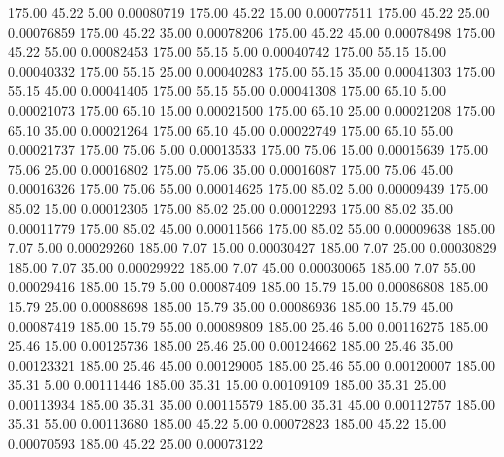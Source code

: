     175.00     45.22      5.00     0.00080719
    175.00     45.22     15.00     0.00077511
    175.00     45.22     25.00     0.00076859
    175.00     45.22     35.00     0.00078206
    175.00     45.22     45.00     0.00078498
    175.00     45.22     55.00     0.00082453
    175.00     55.15      5.00     0.00040742
    175.00     55.15     15.00     0.00040332
    175.00     55.15     25.00     0.00040283
    175.00     55.15     35.00     0.00041303
    175.00     55.15     45.00     0.00041405
    175.00     55.15     55.00     0.00041308
    175.00     65.10      5.00     0.00021073
    175.00     65.10     15.00     0.00021500
    175.00     65.10     25.00     0.00021208
    175.00     65.10     35.00     0.00021264
    175.00     65.10     45.00     0.00022749
    175.00     65.10     55.00     0.00021737
    175.00     75.06      5.00     0.00013533
    175.00     75.06     15.00     0.00015639
    175.00     75.06     25.00     0.00016802
    175.00     75.06     35.00     0.00016087
    175.00     75.06     45.00     0.00016326
    175.00     75.06     55.00     0.00014625
    175.00     85.02      5.00     0.00009439
    175.00     85.02     15.00     0.00012305
    175.00     85.02     25.00     0.00012293
    175.00     85.02     35.00     0.00011779
    175.00     85.02     45.00     0.00011566
    175.00     85.02     55.00     0.00009638
    185.00      7.07      5.00     0.00029260
    185.00      7.07     15.00     0.00030427
    185.00      7.07     25.00     0.00030829
    185.00      7.07     35.00     0.00029922
    185.00      7.07     45.00     0.00030065
    185.00      7.07     55.00     0.00029416
    185.00     15.79      5.00     0.00087409
    185.00     15.79     15.00     0.00086808
    185.00     15.79     25.00     0.00088698
    185.00     15.79     35.00     0.00086936
    185.00     15.79     45.00     0.00087419
    185.00     15.79     55.00     0.00089809
    185.00     25.46      5.00     0.00116275
    185.00     25.46     15.00     0.00125736
    185.00     25.46     25.00     0.00124662
    185.00     25.46     35.00     0.00123321
    185.00     25.46     45.00     0.00129005
    185.00     25.46     55.00     0.00120007
    185.00     35.31      5.00     0.00111446
    185.00     35.31     15.00     0.00109109
    185.00     35.31     25.00     0.00113934
    185.00     35.31     35.00     0.00115579
    185.00     35.31     45.00     0.00112757
    185.00     35.31     55.00     0.00113680
    185.00     45.22      5.00     0.00072823
    185.00     45.22     15.00     0.00070593
    185.00     45.22     25.00     0.00073122
